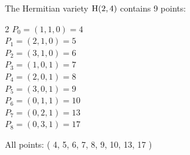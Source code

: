 The Hermitian variety ${\rm H}(2,4)$ contains 9 points:\\
\begin{multicols}{2}
\noindent
$P_{0} = ( 1, 1, 0 )=4$\\
$P_{1} = ( 2, 1, 0 )=5$\\
$P_{2} = ( 3, 1, 0 )=6$\\
$P_{3} = ( 1, 0, 1 )=7$\\
$P_{4} = ( 2, 0, 1 )=8$\\
$P_{5} = ( 3, 0, 1 )=9$\\
$P_{6} = ( 0, 1, 1 )=10$\\
$P_{7} = ( 0, 2, 1 )=13$\\
$P_{8} = ( 0, 3, 1 )=17$\\
\end{multicols}
All points: ( 4, 5, 6, 7, 8, 9, 10, 13, 17 )\\
